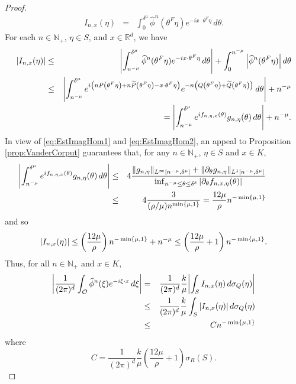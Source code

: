 \documentclass[11pt]{article}
\newcommand{\f}[2]{\frac{#1}{#2}}
\begin{document}
\begin{proof}
\begin{eqnarray*}
    I_{n,x}(\eta)&=&\int_0^{\delta^{\mu}}\widehat{\phi}^n(\theta^F\eta)e^{-ix\cdot\theta^F\eta}\,d\theta.
\end{eqnarray*}
For each $n\in\mathbb{N}_+$, $\eta\in S$, and $x\in\mathbb{R}^d$, we have
\begin{eqnarray*}
\abs{I_{n,x}(\eta)}
&\leq & 
\abs{\int_{n^{-\mu}}^{\delta^{\mu}}\widehat{\phi}^n(\theta^F\eta)e^{-ix\cdot\theta^F\eta}\,d\theta} +\int_{0}^{n^{-\mu}}\abs{\widehat{\phi}^n(\theta^F\eta)}\,d\theta\\
&\leq& \abs{\int_{n^{-\mu}}^{\delta^\mu} e^{i\left(nP\left(\theta^F\eta\right)+n\widetilde{P}\left(\theta^F\eta\right)-x\cdot\theta^F\eta\right)}e^{-n\left(Q\left(\theta^F\eta\right)+\widetilde{Q}\left(\theta^F\eta\right)\right)}\,d\theta}+n^{-\mu}\\
& &\hspace{1cm}=\abs{\int_{n^{-\mu}}^{\delta^\mu} e^{i f_{n,\eta,x}(\theta) } g_{n,\eta}(\theta)\,d\theta} 
+ n^{-\mu}.
\end{eqnarray*}
In view of \eqref{eq:EstImagHom1} and \eqref{eq:EstImagHom2}, an appeal to Proposition \ref{prop:VanderCorput} guarantees that, for any $n\in\mathbb{N}_+$, $\eta\in S$ and $x\in K$,
\begin{eqnarray*}
 \hspace{-1cm}\abs{\int_{n^{-\mu}}^{\delta^\mu}e^{if_{n,\eta,x}(\theta)}g_{n,\eta}(\theta)\,d\theta}
    &\leq& 
    4
    \frac{ 
    \|g_{n,\eta}\|_{L^\infty[n^{-\mu},\delta^{\mu}]}
    +
    \|\partial_{\theta}g_{n,\eta}\|_{L^1[n^{-\mu},\delta^{\mu}]}
    }{
    \inf_{n^{-\mu}\leq\theta\leq \delta^{\delta}}|\partial_{\theta}f_{n,x,\eta}(\theta)|
    }\\
    &\leq& 4\frac{3}{(\rho/\mu) n^{\min\{\mu,1\}}}=\frac{12\mu}{\rho}n^{-\min\{\mu,1\}}
\end{eqnarray*}
and so
\begin{equation*}
    \abs{I_{n,x}(\eta)}\leq \left(\frac{12\mu}{\rho}\right)n^{-\min\{\mu,1\}}+n^{-\mu}\leq \left(\frac{12\mu}{\rho}+1\right)n^{-\min\{\mu,1\}}.
\end{equation*}
Thus, for all $n\in\mathbb{N}_+$ and $x\in K$,
\begin{eqnarray*}
\abs{\f{1}{(2\pi)^d}\int_{\mathcal{O}}\widehat{\phi}^n(\xi)e^{-i\xi\cdot x}\,d\xi}
&=&\frac{1}{(2\pi)^d}\f{k}{\mu}\abs{\int_S I_{n,x}(\eta)\,d\sigma_Q(\eta)} \\
&\leq& \frac{1}{(2\pi)^d}\f{k}{\mu}\int_S \abs{I_{n,x}(\eta)}\,d\sigma_Q(\eta)\\
&\leq& Cn^{-\min\{\mu,1\}}
\end{eqnarray*}
where
\begin{equation*}
    C=\f{1}{(2\pi)^d} \f{k}{\mu} \left(\frac{12\mu}{\rho}+1\right)\sigma_R(S).
\end{equation*}
\end{proof}
\end{document}
